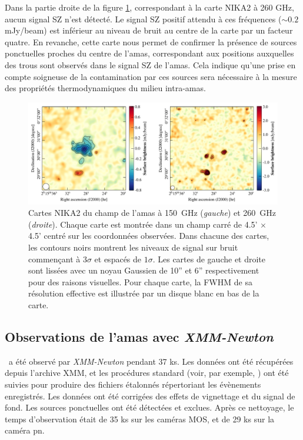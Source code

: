 Dans la partie droite de la figure \ref{fig:act:nkmaps}, correspondant à la carte NIKA2 à 260 GHz, aucun signal SZ n'est détecté.
Le signal SZ positif attendu à ces fréquences ($\sim 0.2$ mJy/beam) est inférieur au niveau de bruit au centre de la carte par un facteur quatre.
En revanche, cette carte nous permet de confirmer la présence de sources ponctuelles proches du centre de l'amas, correspondant aux positions auxquelles des trous sont observés dans le signal SZ de l'amas.
Cela indique qu'une prise en compte soigneuse de la contamination par ces sources sera nécessaire à la mesure des propriétés thermodynamiques du milieu intra-amas.

\begin{figure}[t]
    \centering
    \includegraphics[width=\textwidth]{Figures/Chap_actj0215/nk_maps.pdf}
    \caption{
        Cartes NIKA2 du champ de l'amas à 150~GHz (\textit{gauche}) et 260~GHz (\textit{droite}).
        Chaque carte est montrée dans un champ carré de 4.5' $\times$4.5'  centré sur les coordonnées observées.
        Dans chacune des cartes, les contours noirs montrent les niveaux de signal sur bruit commençant à $3\sigma$ et espacés de $1\sigma$.
        Les cartes de gauche et droite sont lissées avec un noyau Gaussien de 10''  et 6''  respectivement pour des raisons visuelles.
        Pour chaque carte, la FWHM de sa résolution effective est illustrée par un disque blanc en bas de la carte.
    }
    \label{fig:act:nkmaps}
\end{figure}

\subsection{Observations de l'amas avec \textit{XMM-Newton}}\label{subsec:act:xmm}

\act\ a été observé par \textit{XMM-Newton} pendant 37 ks.
Les données ont été récupérées depuis l'archive XMM, et les procédures standard (voir, par exemple, \cite{bartalucci_resolving_2017}) ont été suivies pour produire des fichiers étalonnés répertoriant les évènements enregistrés.
Les données ont été corrigées des effets de vignettage et du signal de fond.
Les sources ponctuelles ont été détectées et exclues.
Après ce nettoyage, le temps d'observation était de 35 ks sur les caméras MOS, et de 29 ks sur la caméra pn.


